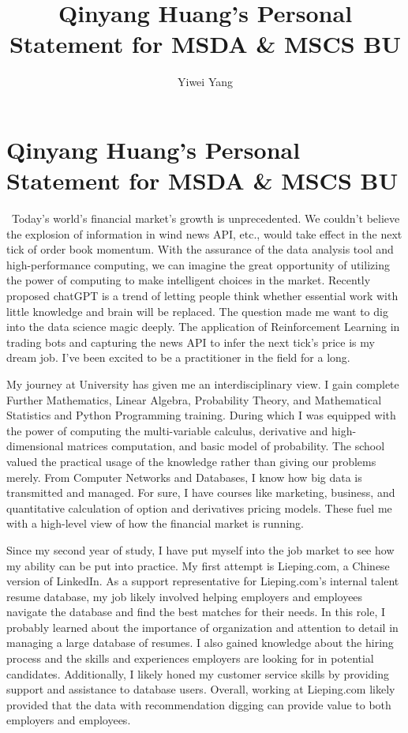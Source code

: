 \documentclass[a4paper,english]{article}
\title{Qinyang Huang's Personal Statement for MSDA \& MSCS BU}
\author{Yiwei Yang}
\def\centersec#1{\centering#1} %
\begin{document}
\section*{\centersec{Qinyang Huang's Personal Statement for MSDA \& MSCS BU}}
\quad\ Today's world's financial market's growth is unprecedented. We couldn't believe the explosion of information in wind news API, etc., would take effect in the next tick of order book momentum. With the assurance of the data analysis tool and high-performance computing, we can imagine the great opportunity of utilizing the power of computing to make intelligent choices in the market. Recently proposed chatGPT is a trend of letting people think whether essential work with little knowledge and brain will be replaced. The question made me want to dig into the data science magic deeply. The application of Reinforcement Learning in trading bots and capturing the news API to infer the next tick's price is my dream job. I've been excited to be a practitioner in the field for a long.

My journey at University has given me an interdisciplinary view. I gain complete Further Mathematics, Linear Algebra, Probability Theory, and Mathematical Statistics and Python Programming training. During which I was equipped with the power of computing the multi-variable calculus, derivative and high-dimensional matrices computation, and basic model of probability. The school valued the practical usage of the knowledge rather than giving our problems merely. From Computer Networks and Databases, I know how big data is transmitted and managed. For sure, I have courses like marketing, business, and quantitative calculation of option and derivatives pricing models. These fuel me with a high-level view of how the financial market is running.

Since my second year of study, I have put myself into the job market to see how my ability can be put into practice. My first attempt is Lieping.com, a Chinese version of LinkedIn. As a support representative for Lieping.com's internal talent resume database, my job likely involved helping employers and employees navigate the database and find the best matches for their needs. In this role, I probably learned about the importance of organization and attention to detail in managing a large database of resumes. I also gained knowledge about the hiring process and the skills and experiences employers are looking for in potential candidates. Additionally, I likely honed my customer service skills by providing support and assistance to database users. Overall, working at Lieping.com likely provided that the data with recommendation digging can provide value to both employers and employees. 
\end{document}
